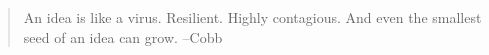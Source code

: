 \begin{quote}
An idea is like a virus. Resilient. Highly contagious. And even the smallest seed of an idea can grow.   --Cobb

\end{quote}

